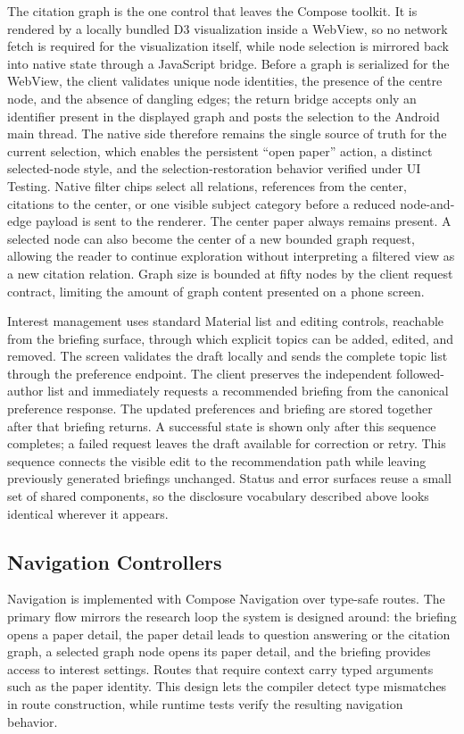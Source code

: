 The citation graph is the one control that leaves the Compose toolkit.
It is rendered by a locally bundled D3 visualization inside a WebView, so no network fetch is required for the visualization itself, while node selection is mirrored back into native state through a JavaScript bridge.
Before a graph is serialized for the WebView, the client validates unique node identities, the presence of the centre node, and the absence of dangling edges; the return bridge accepts only an identifier present in the displayed graph and posts the selection to the Android main thread.
The native side therefore remains the single source of truth for the current selection, which enables the persistent ``open paper'' action, a distinct selected-node style, and the selection-restoration behavior verified under UI Testing.
Native filter chips select all relations, references from the center, citations
to the center, or one visible subject category before a reduced node-and-edge
payload is sent to the renderer. The center paper always remains present. A
selected node can also become the center of a new bounded graph request, allowing
the reader to continue exploration without interpreting a filtered view as a
new citation relation.
Graph size is bounded at fifty nodes by the client request contract, limiting the amount of graph content presented on a phone screen.

Interest management uses standard Material list and editing controls, reachable from the briefing surface, through which explicit topics can be added, edited, and removed. The screen validates the draft locally and sends the complete topic list through the preference endpoint. The client preserves the independent followed-author list and immediately requests a recommended briefing from the canonical preference response. The updated preferences and briefing are stored together after that briefing returns. A successful state is shown only after this sequence completes; a failed request leaves the draft available for correction or retry. This sequence connects the visible edit to the recommendation path while leaving previously generated briefings unchanged.
Status and error surfaces reuse a small set of shared components, so the disclosure vocabulary described above looks identical wherever it appears.

\subsection{Navigation Controllers}

Navigation is implemented with Compose Navigation over type-safe routes.
The primary flow mirrors the research loop the system is designed around: the briefing opens a paper detail, the paper detail leads to question answering or the citation graph, a selected graph node opens its paper detail, and the briefing provides access to interest settings.
Routes that require context carry typed arguments such as the paper identity. This design lets the compiler detect type mismatches in route construction, while runtime tests verify the resulting navigation behavior.

